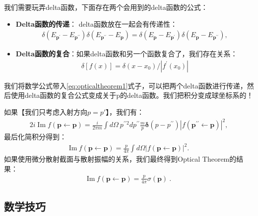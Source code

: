   \bigskip

  我们需要玩弄delta函数，下面存在两个会用到的delta函数的公式：
  \begin{itemize}
    \item \textbf{Delta函数的传递}： delta函数放在一起会有传递性：
      \begin{align}
        \delta\left(E_{\mathbf{p}^{\prime}}-E_{\mathbf{p}^{\prime\prime}}\right)
        \delta\left(E_{\mathbf{p}^{\prime\prime}}-E_{\mathbf{p}}\right)
        =
        \delta\left(E_{\mathbf{p}}-E_{\mathbf{p}^{\prime}}\right)
        \delta\left(E_{\mathbf{p}}-E_{\mathbf{p}^{\prime\prime}}\right),
      \end{align}
    \item \textbf{Delta函数的复合}：如果delta函数和另一个函数复合了，我们存在关系：
      \begin{align}
        \delta\left[f(x)\right]=\delta(x-x_0)/\left|f^{\prime}(x_0)\right|
      \end{align}

  \end{itemize}

  \bigskip

  我们将数学公式带入\cref{eq:opticaltheorem1}式子，可以把两个delta函数进行传递，然后使用delta函数的复合公式变成关于p的delta函数。我们把积分变成球坐标系的！

  如果【我们只考虑入射方向$ p = p' $】，我们有：
  \begin{align}
    2i\operatorname{Im}f\left(\mathbf{p}\leftarrow\mathbf{p}\right)=\frac{i}{2\pi
    m}\int d\Omega
    \ p^{\prime\prime2}dp^{\prime\prime}\frac{m}{p}\boldsymbol{\delta}\left(p-p^{\prime\prime}\right)\left|f\left(\mathbf{p}^{\prime\prime}\leftarrow\mathbf{p}\right)\right|^2,
  \end{align}
  最后化简积分得到：
  \begin{align}
    \mathrm{Im~}f\left(\mathbf{p}\leftarrow\mathbf{p}\right)=\frac{p}{4\pi}\int
    d\Omega\left|f\left(\mathbf{p}\leftarrow\mathbf{p}\right)\right|^2.
  \end{align}
  如果使用微分散射截面与散射振幅的关系，我们最终得到Optical Theorem的结果：
  \begin{align}
    \mathrm{Im~}f\left(\mathbf{p}\leftarrow\mathbf{p}\right)=\frac{p}{4\pi}\sigma(\mathbf{p})\mathrm{~.}
  \end{align}

  \subsection{数学技巧}


